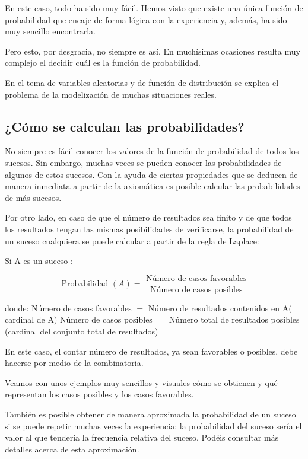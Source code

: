 \documentclass[
]{article}
\begin{document}
En este caso, todo ha sido muy fácil. Hemos visto que existe una única
función de probabilidad que encaje de forma lógica con la experiencia y,
además, ha sido muy sencillo encontrarla.

Pero esto, por desgracia, no siempre es así. En muchísimas ocasiones
resulta muy complejo el decidir cuál es la función de probabilidad.

En el tema de variables aleatorias y de función de distribución se
explica el problema de la modelización de muchas situaciones reales.

\subsection{¿Cómo se calculan las probabilidades?}\label{cuxf3mo-se-calculan-las-probabilidades}

No siempre es fácil conocer los valores de la función de probabilidad de
todos los sucesos. Sin embargo, muchas veces se pueden conocer las
probabilidades de algunos de estos sucesos. Con la ayuda de ciertas
propiedades que se deducen de manera inmediata a partir de la axiomática
es posible calcular las probabilidades de más sucesos.

Por otro lado, en caso de que el número de resultados sea finito y de
que todos los resultados tengan las mismas posibilidades de verificarse,
la probabilidad de un suceso cualquiera se puede calcular a partir de la
regla de Laplace:

Si A es un suceso :

\[
\text { Probabilidad }(A)=\frac{\text { Número de casos favorables }}{\text { Número de casos posibles }}
\]

donde: Número de casos favorables \(=\) Número de resultados contenidos en
\(\mathrm{A}(\) cardinal de A\()\) Número de casos posibles \(=\) Número total
de resultados posibles (cardinal del conjunto total de resultados)

En este caso, el contar número de resultados, ya sean favorables o
posibles, debe hacerse por medio de la combinatoria.

Veamos con unos ejemplos muy sencillos y visuales cómo se obtienen y qué
representan los casos posibles y los casos favorables.

También es posible obtener de manera aproximada la probabilidad de un
suceso si se puede repetir muchas veces la experiencia: la probabilidad
del suceso sería el valor al que tendería la frecuencia relativa del
suceso. Podéis consultar más detalles acerca de esta aproximación.
\end{document}
